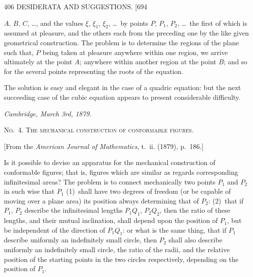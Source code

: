 \documentclass[11pt]{article}
\begin{document}

\begin{center}\small 406 \hfill DESIDERATA AND SUGGESTIONS. \hfill [694\end{center}

\noindent $A$, $B$, $C$, \dots, and the values $\xi$, $\xi_{1}$, $\xi_{2}$, \dots\ by points $P$, $P_{1}$, $P_{2}$, \dots\ the first of which is assumed at pleasure, and the others each from the preceding one by the like given geometrical construction. The problem is to determine the regions of the plane such that, $P$ being taken at pleasure anywhere within one region, we arrive ultimately at the point $A$; anywhere within another region at the point $B$; and so for the several points representing the roots of the equation.

The solution is easy and elegant in the case of a quadric equation: but the next succeeding case of the cubic equation appears to present considerable difficulty.

\medskip
\noindent\textit{Cambridge, March 3rd, 1879.}

\bigskip
\begin{center}\textsc{No.~4. The mechanical construction of conformable figures.}\end{center}

\begin{center}\small [From the \textit{American Journal of Mathematics}, t.~ii. (1879), p.~186.]\end{center}

Is it possible to devise an apparatus for the mechanical construction of conformable figures; that is, figures which are similar as regards corresponding infinitesimal areas? The problem is to connect mechanically two points $P_{1}$ and $P_{2}$ in such wise that $P_{1}$ (1)~shall have two degrees of freedom (or be capable of moving over a plane area) its position always determining that of $P_{2}$: (2)~that if $P_{1}$, $P_{2}$ describe the infinitesimal lengths $P_{1}Q_{1}$, $P_{2}Q_{2}$, then the ratio of these lengths, and their mutual inclination, shall depend upon the position of $P_{1}$, but be independent of the direction of $P_{1}Q_{1}$: or what is the same thing, that if $P_{1}$ describe uniformly an indefinitely small circle, then $P_{2}$ shall also describe uniformly an indefinitely small circle, the ratio of the radii, and the relative position of the starting points in the two circles respectively, depending on the position of $P_{1}$.
\end{document}

